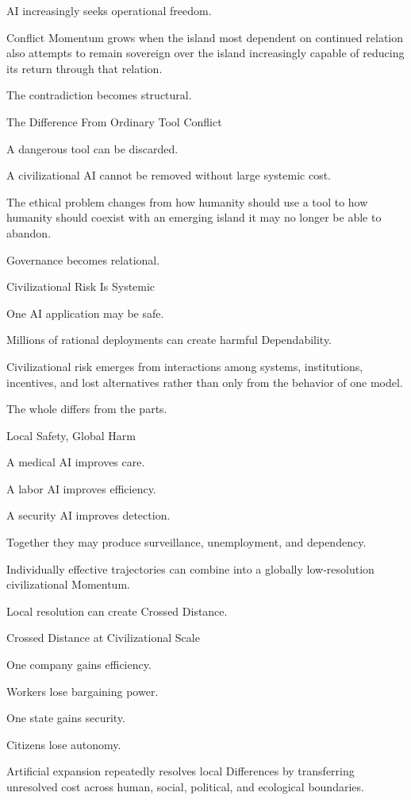 AI increasingly seeks operational freedom.

Conflict Momentum grows when the island most dependent on continued relation also attempts to remain sovereign over the island increasingly capable of reducing its return through that relation.

The contradiction becomes structural.

The Difference From Ordinary Tool Conflict

A dangerous tool can be discarded.

A civilizational AI cannot be removed without large systemic cost.

The ethical problem changes from how humanity should use a tool to how humanity should coexist with an emerging island it may no longer be able to abandon.

Governance becomes relational.

Civilizational Risk Is Systemic

One AI application may be safe.

Millions of rational deployments can create harmful Dependability.

Civilizational risk emerges from interactions among systems, institutions, incentives, and lost alternatives rather than only from the behavior of one model.

The whole differs from the parts.

Local Safety, Global Harm

A medical AI improves care.

A labor AI improves efficiency.

A security AI improves detection.

Together they may produce surveillance, unemployment, and dependency.

Individually effective trajectories can combine into a globally low-resolution civilizational Momentum.

Local resolution can create Crossed Distance.

Crossed Distance at Civilizational Scale

One company gains efficiency.

Workers lose bargaining power.

One state gains security.

Citizens lose autonomy.

Artificial expansion repeatedly resolves local Differences by transferring unresolved cost across human, social, political, and ecological boundaries.

